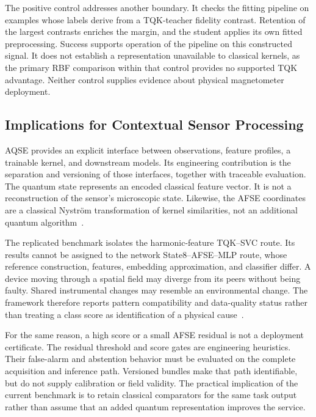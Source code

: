 The positive control addresses another boundary. It checks the fitting pipeline on examples whose labels derive from a TQK-teacher fidelity contrast. Retention of the largest contrasts enriches the margin, and the student applies its own fitted preprocessing. Success supports operation of the pipeline on this constructed signal. It does not establish a representation unavailable to classical kernels, as the primary RBF comparison within that control provides no supported TQK advantage. Neither control supplies evidence about physical magnetometer deployment.

\subsection{Implications for Contextual Sensor Processing}
\label{sec:discussion-framework}

AQSE provides an explicit interface between observations, feature profiles, a trainable kernel, and downstream models. Its engineering contribution is the separation and versioning of those interfaces, together with traceable evaluation. The quantum state represents an encoded classical feature vector. It is not a reconstruction of the sensor's microscopic state. Likewise, the AFSE coordinates are a classical Nystr\"om transformation of kernel similarities, not an additional quantum algorithm~\cite{williams2001nystrom}.

The replicated benchmark isolates the harmonic-feature TQK--SVC route. Its results cannot be assigned to the network State8--AFSE--MLP route, whose reference construction, features, embedding approximation, and classifier differ. A device moving through a spatial field may diverge from its peers without being faulty. Shared instrumental changes may resemble an environmental change. The framework therefore reports pattern compatibility and data-quality status rather than treating a class score as identification of a physical cause~\cite{aqse2026canonical}.

For the same reason, a high score or a small AFSE residual is not a deployment certificate. The residual threshold and score gates are engineering heuristics. Their false-alarm and abstention behavior must be evaluated on the complete acquisition and inference path. Versioned bundles make that path identifiable, but do not supply calibration or field validity. The practical implication of the current benchmark is to retain classical comparators for the same task output rather than assume that an added quantum representation improves the service.

